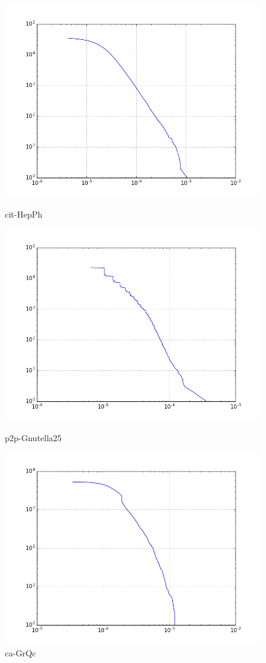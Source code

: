 \begin{figure}[H]
  \includegraphics[width=\linewidth]{img/cit-HepPh/pagerank_ccdf.png}
  \caption*{cit-HepPh}
\endminipage\hfill
{}
  \includegraphics[width=\linewidth]{img/p2p-Gnutella25/pagerank_ccdf.png}
  \caption*{p2p-Gnutella25}
\endminipage\hfill
{}
  \includegraphics[width=\linewidth]{img/ca-GrQc/pagerank_ccdf.png}
  \caption*{ca-GrQc}
\endminipage
\end{figure}
